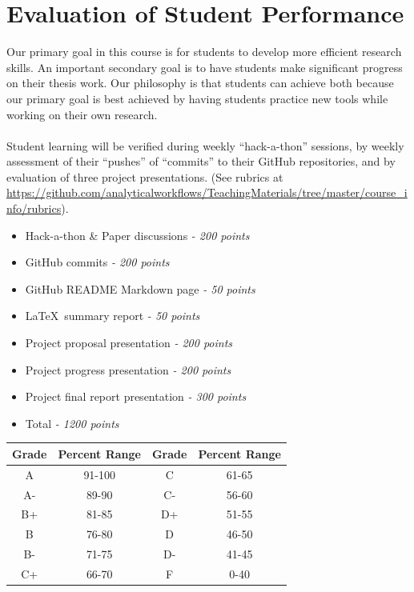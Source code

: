 \documentclass[10pt]{article}
\begin{document}
\section*{Evaluation of Student Performance}
Our primary goal in this course is for students to develop more efficient research skills.  
An important secondary goal is to have students make significant progress on their thesis work.  
Our philosophy is that students can achieve both because our primary goal is best achieved by having 
students practice new tools while working on their own research.
\\\\
Student learning will be verified during weekly ``hack-a-thon'' sessions, by weekly assessment of their 
``pushes'' of ``commits'' to their GitHub repositories, and by evaluation of three project presentations.  
(See rubrics at 
\url{https://github.com/analyticalworkflows/TeachingMaterials/tree/master/course_info/rubrics}).

\begin{itemize}[leftmargin=2cm]
\itemsep0em
\item Hack-a-thon \& Paper discussions \emph{- 200 points}
\item GitHub commits \emph{- 200 points}
\item GitHub README Markdown page \emph{- 50 points}
\item \LaTeX\ summary report \emph{- 50 points}
\item Project proposal presentation \emph{- 200 points}
\item Project progress presentation \emph{- 200 points}
\item Project final report presentation \emph{- 300 points}
\item Total \emph{- 1200 points}
\end{itemize}

\begin{center}
\begin{tabular}{|c|c||c|c|}
	\hline
	Grade &  Percent Range & Grade  & Percent Range   \\
	\hline
	\hline
	A & 91-100 &  C &  61-65 \\
	\hline
	A-&  89-90&  C-&  56-60  \\
	\hline
	B+& 81-85 &  D+& 51-55 \\
	\hline
	B & 76-80 &  D&  46-50 \\
	\hline
	B- & 71-75 & D- &  41-45 \\
	\hline
	C+&  66-70&  F & 0-40 \\
	\hline
	\hline
\end{tabular}
\end{center}
\end{document}
